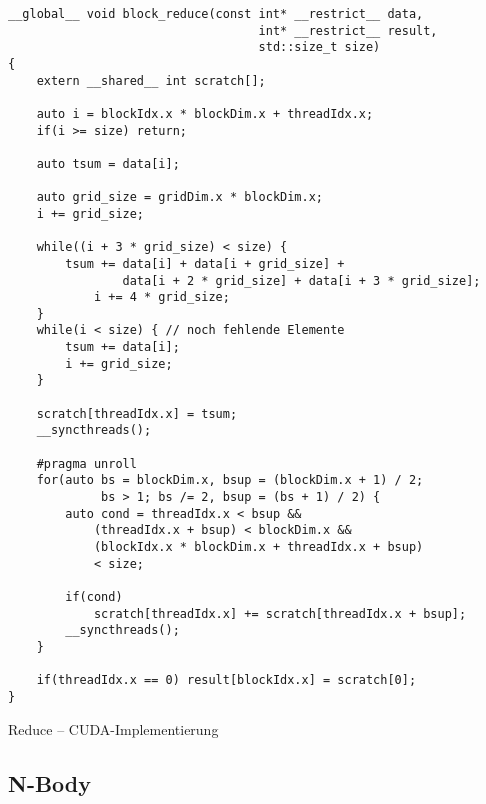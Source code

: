 \begin{code}
    \begin{verbatim}
__global__ void block_reduce(const int* __restrict__ data,
                                   int* __restrict__ result,
                                   std::size_t size)
{
    extern __shared__ int scratch[]; 

    auto i = blockIdx.x * blockDim.x + threadIdx.x;
    if(i >= size) return;

    auto tsum = data[i];

    auto grid_size = gridDim.x * blockDim.x;
    i += grid_size;

    while((i + 3 * grid_size) < size) {
        tsum += data[i] + data[i + grid_size] +
                data[i + 2 * grid_size] + data[i + 3 * grid_size];
            i += 4 * grid_size;
    }
    while(i < size) { // noch fehlende Elemente
        tsum += data[i];
        i += grid_size;
    }

    scratch[threadIdx.x] = tsum;
    __syncthreads();

    #pragma unroll
    for(auto bs = blockDim.x, bsup = (blockDim.x + 1) / 2;
             bs > 1; bs /= 2, bsup = (bs + 1) / 2) {
        auto cond = threadIdx.x < bsup &&
            (threadIdx.x + bsup) < blockDim.x &&
            (blockIdx.x * blockDim.x + threadIdx.x + bsup)
            < size;

        if(cond)
            scratch[threadIdx.x] += scratch[threadIdx.x + bsup];
        __syncthreads();
    }

    if(threadIdx.x == 0) result[blockIdx.x] = scratch[0];
}
    \end{verbatim}
    \caption{Reduce -- CUDA-Implementierung}
    \label{anhang:cuda:reduction}
\end{code}

\subsection{N-Body}


